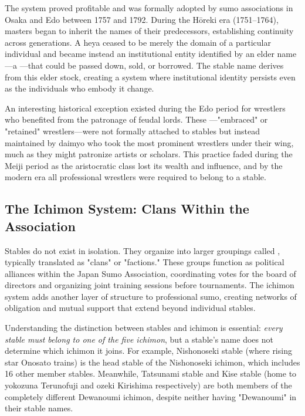 The system proved profitable and was formally adopted by sumo associations in Osaka and Edo between 1757 and 1792. During the Hōreki era (1751--1764), masters began to inherit the names of their predecessors, establishing continuity across generations. A heya ceased to be merely the domain of a particular individual and became instead an institutional entity identified by an elder name—a —that could be passed down, sold, or borrowed. The stable name derives from this elder stock, creating a system where institutional identity persists even as the individuals who embody it change.

An interesting historical exception existed during the Edo period for wrestlers who benefited from the patronage of feudal lords. These —"embraced" or "retained" wrestlers—were not formally attached to stables but instead maintained by daimyo who took the most prominent wrestlers under their wing, much as they might patronize artists or scholars. This practice faded during the Meiji period as the aristocratic class lost its wealth and influence, and by the modern era all professional wrestlers were required to belong to a stable.

\subsection{The Ichimon System: Clans Within the Association}

Stables do not exist in isolation. They organize into larger groupings called , typically translated as "clans" or "factions." These groups function as political alliances within the Japan Sumo Association, coordinating votes for the board of directors and organizing joint training sessions before tournaments. The ichimon system adds another layer of structure to professional sumo, creating networks of obligation and mutual support that extend beyond individual stables.

Understanding the distinction between stables and ichimon is essential: \textit{every stable must belong to one of the five ichimon}, but a stable's name does not determine which ichimon it joins. For example, Nishonoseki stable (where rising star Onosato trains) is the head stable of the Nishonoseki ichimon, which includes 16 other member stables. Meanwhile, Tatsunami stable and Kise stable (home to yokozuna Terunofuji and ozeki Kirishima respectively) are both members of the completely different Dewanoumi ichimon, despite neither having "Dewanoumi" in their stable names.

